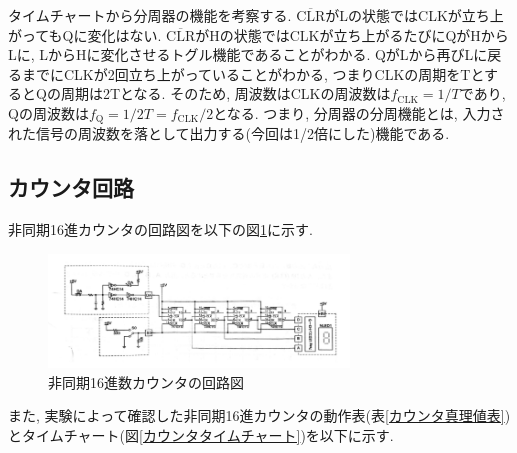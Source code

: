 \documentclass[a4paper, 11pt, uplatex]{jsarticle}
\begin{document}
タイムチャートから分周器の機能を考察する.
$\overline{\mathrm{CLR}}$がLの状態ではCLKが立ち上がってもQに変化はない.
$\overline{\mathrm{CLR}}$がHの状態ではCLKが立ち上がるたびにQがHからLに,  LからHに変化させるトグル機能であることがわかる.
QがLから再びLに戻るまでにCLKが2回立ち上がっていることがわかる,  つまりCLKの周期をTとするとQの周期は2Tとなる.
そのため,  周波数はCLKの周波数は$f_{\mathrm{CLK}}=1/T$であり,  Qの周波数は$f_\mathrm{Q}=1/2T=f_{\mathrm{CLK}}/2$となる.
つまり,  分周器の分周機能とは,  入力された信号の周波数を落として出力する(今回は1/2倍にした)機能である.

\subsection{カウンタ回路}

非同期16進カウンタの回路図を以下の図\ref{カウンタ回路}に示す.

\begin{figure}[H]
  \begin{center}
    \includegraphics[width = 8cm]{画像/カウンタ.png}
    \caption{非同期16進数カウンタの回路図}
    \label{カウンタ回路}
  \end{center}
\end{figure}

また,  実験によって確認した非同期16進カウンタの動作表(表\ref{カウンタ真理値表})とタイムチャート(図\ref{カウンタタイムチャート})を以下に示す.
\end{document}
